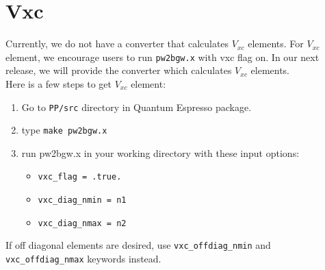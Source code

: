 \documentclass[letterpaper,12pt]{article}
\begin{document}
\newpage
\section{Vxc}
Currently, we do not have a converter that calculates $V_{xc}$ elements. For $V_{xc}$ element, we encourage users to run \verb+pw2bgw.x+ with vxc flag on. In our next release, we will provide the converter which calculates $V_{xc}$ elements.\\ 
Here is a few steps to get $V_{xc}$ element:

\begin{enumerate}
\item Go to \verb+PP/src+ directory in Quantum Espresso package.
\item type \verb+make pw2bgw.x+ 
\item run pw2bgw.x in your working directory with these input options:
\begin{itemize}
\item \verb+vxc_flag = .true.+
\item \verb+vxc_diag_nmin = n1+
\item \verb+vxc_diag_nmax = n2+
\end{itemize}
\end{enumerate}

If off diagonal elements are desired, use \verb+vxc_offdiag_nmin+ and \verb+vxc_offdiag_nmax+ keywords instead. 
\end{document}
